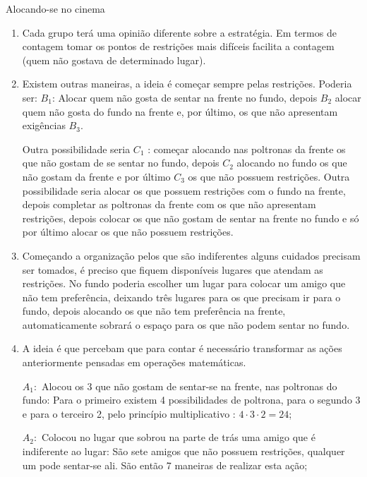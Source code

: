 \begin{answer}{Alocando-se no cinema}
{
\begin{enumerate}
\item Cada grupo terá uma opinião diferente sobre a estratégia. Em termos de contagem tomar os  pontos de restrições mais difíceis facilita a contagem (quem não gostava de determinado lugar).

\item Existem outras maneiras, a ideia é começar sempre pelas restrições. Poderia ser: $B_1$: Alocar quem não gosta de sentar na frente no fundo, depois $B_2$ alocar quem não gosta do fundo na frente e, por último, os que não apresentam exigências $B_3$.  

Outra possibilidade seria $C_1$ : começar alocando nas poltronas da frente os que não gostam de se sentar no fundo, depois $C_2$ alocando no fundo os que não gostam da frente e por último $C_3$ os que não possuem restrições. Outra possibilidade seria alocar os que possuem restrições com o fundo na frente, depois completar as poltronas da frente com os que não apresentam restrições, depois colocar os que não gostam de sentar na frente no fundo e só por último alocar os que não possuem restrições. 

\item Começando a organização pelos que são indiferentes alguns cuidados precisam ser tomados, é preciso que fiquem disponíveis lugares que atendam as restrições. No fundo poderia escolher um lugar para colocar um amigo que não tem preferência, deixando três lugares para os que precisam ir para o fundo, depois alocando os que não tem preferência na frente, automaticamente sobrará o espaço para os que não podem sentar no fundo. 
\item A ideia é que percebam que para contar é necessário transformar as ações anteriormente pensadas em operações matemáticas. 

$A_1:$ Alocou os 3 que não gostam de sentar-se na frente, nas poltronas do fundo: Para o primeiro existem 4 possibilidades de poltrona, para o segundo 3 e para o terceiro 2, pelo princípio multiplicativo : $4\cdot 3 \cdot 2= 24$;

$A_2:$ Colocou no lugar que sobrou na parte de trás uma amigo que é indiferente ao lugar: São sete amigos que não possuem restrições, qualquer um pode sentar-se ali. São então 7 maneiras de realizar esta ação;


\end{enumerate}}
\end{answer}
